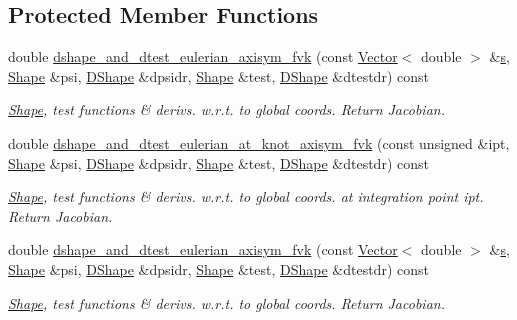 \subsection*{Protected Member Functions}
\begin{DoxyCompactItemize}
\item 
double \hyperlink{classoomph_1_1AxisymFoepplvonKarmanElement_a0eb2dfad7aef696dfeabb51595db46db}{dshape\+\_\+and\+\_\+dtest\+\_\+eulerian\+\_\+axisym\+\_\+fvk} (const \hyperlink{classoomph_1_1Vector}{Vector}$<$ double $>$ \&\hyperlink{cfortran_8h_ab7123126e4885ef647dd9c6e3807a21c}{s}, \hyperlink{classoomph_1_1Shape}{Shape} \&psi, \hyperlink{classoomph_1_1DShape}{D\+Shape} \&dpsidr, \hyperlink{classoomph_1_1Shape}{Shape} \&test, \hyperlink{classoomph_1_1DShape}{D\+Shape} \&dtestdr) const
\begin{DoxyCompactList}\small\item\em \hyperlink{classoomph_1_1Shape}{Shape}, test functions \& derivs. w.\+r.\+t. to global coords. Return Jacobian. \end{DoxyCompactList}\item 
double \hyperlink{classoomph_1_1AxisymFoepplvonKarmanElement_a20841d263ec4590d5614d43f2f813ae7}{dshape\+\_\+and\+\_\+dtest\+\_\+eulerian\+\_\+at\+\_\+knot\+\_\+axisym\+\_\+fvk} (const unsigned \&ipt, \hyperlink{classoomph_1_1Shape}{Shape} \&psi, \hyperlink{classoomph_1_1DShape}{D\+Shape} \&dpsidr, \hyperlink{classoomph_1_1Shape}{Shape} \&test, \hyperlink{classoomph_1_1DShape}{D\+Shape} \&dtestdr) const
\begin{DoxyCompactList}\small\item\em \hyperlink{classoomph_1_1Shape}{Shape}, test functions \& derivs. w.\+r.\+t. to global coords. at integration point ipt. Return Jacobian. \end{DoxyCompactList}\item 
double \hyperlink{classoomph_1_1AxisymFoepplvonKarmanElement_a0eb2dfad7aef696dfeabb51595db46db}{dshape\+\_\+and\+\_\+dtest\+\_\+eulerian\+\_\+axisym\+\_\+fvk} (const \hyperlink{classoomph_1_1Vector}{Vector}$<$ double $>$ \&\hyperlink{cfortran_8h_ab7123126e4885ef647dd9c6e3807a21c}{s}, \hyperlink{classoomph_1_1Shape}{Shape} \&psi, \hyperlink{classoomph_1_1DShape}{D\+Shape} \&dpsidr, \hyperlink{classoomph_1_1Shape}{Shape} \&test, \hyperlink{classoomph_1_1DShape}{D\+Shape} \&dtestdr) const
\begin{DoxyCompactList}\small\item\em \hyperlink{classoomph_1_1Shape}{Shape}, test functions \& derivs. w.\+r.\+t. to global coords. Return Jacobian. \end{DoxyCompactList}\item 

\end{DoxyCompactItemize}
